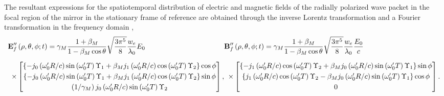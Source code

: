 \documentclass[10pt, a4paper, twoside, openright]{report}
\renewcommand{\vec}[1]{\boldsymbol{\mathrm{#1}}}
\begin{document}
The resultant expressions for the spatiotemporal distribution of electric and magnetic fields of the radially polarized wave packet in the focal region of the mirror in the stationary frame of reference are obtained through the inverse Lorentz transformation and a Fourier transformation in the frequency domain \cite{Jeong2021},
\begin{subequations}
\begin{equation}\label{eq:reflected_e_lab_frame_parabolic}
\begin{aligned}
\vec{E}^{\prime \prime}_{f} & \left(\rho, \theta, \phi; t \right) = \gamma_M \frac{1 + \beta_M}{1 - \beta_M \cos \theta} \sqrt{\frac{3 \pi^5}{8}} \frac{w_e}{\lambda_0} E_0 \\[2mm]
\times &
\begin{bmatrix}
	\left\lbrace -j_0 \left( \omega_0^{\prime} R / c \right) \sin \left(\omega_0^{\prime} T \right) \Upsilon_1 + \beta_M j_1 \left( \omega_0^{\prime} R / c \right) \cos \left(\omega_0^{\prime} T \right) \Upsilon_2 \right\rbrace \cos \phi \\[1mm]
	\left\lbrace -j_0 \left( \omega_0^{\prime} R / c \right) \sin \left(\omega_0^{\prime} T \right) \Upsilon_1 + \beta_M j_1 \left( \omega_0^{\prime} R / c \right) \cos \left(\omega_0^{\prime} T \right) \Upsilon_2 \right\rbrace \sin \phi \\[1mm]
	\left( 1 / \gamma_M \right) j_0 \left( \omega_0^{\prime} R / c \right) \sin \left(\omega_0^{\prime} T \right) \Upsilon_2
\end{bmatrix},
\end{aligned}
\end{equation}\vspace{2mm}
\begin{equation}\label{eq:reflected_b_lab_frame_parabolic}
\begin{aligned}
\vec{B}^{\prime \prime}_{f} & \left(\rho, \theta, \phi; t \right) = \gamma_M \frac{1 + \beta_M}{1 - \beta_M \cos \theta} \sqrt{\frac{3 \pi^5}{8}} \frac{w_e}{\lambda_0} \frac{E_0}{c} \\[2mm]
\times & 
\begin{bmatrix}
	\left\lbrace -j_1 \left( \omega_0^{\prime} R / c \right) \cos \left(\omega_0^{\prime} T \right) \Upsilon_2 + \beta_M j_0 \left( \omega_0^{\prime} R / c \right) \sin \left(\omega_0^{\prime} T \right) \Upsilon_1 \right\rbrace \sin \phi \\[1mm]
	\left\lbrace j_1 \left( \omega_0^{\prime} R / c \right) \cos \left(\omega_0^{\prime} T \right) \Upsilon_2 - \beta_M j_0 \left( \omega_0^{\prime} R / c \right) \sin \left(\omega_0^{\prime} T \right) \Upsilon_1 \right\rbrace \cos \phi \\[1mm]
	0
\end{bmatrix}.
\end{aligned}
\end{equation}
\end{subequations}
\end{document}
